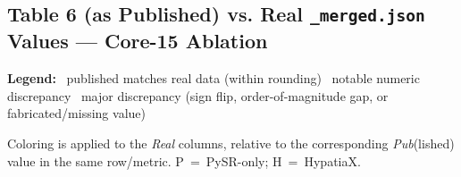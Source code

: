 \documentclass[10pt]{article}
\newcommand{\legenditem}[2]{\colorbox{#1}{\phantom{XX}}~#2}
\begin{document}
\begin{landscape}

\section*{Table 6 (as Published) vs. Real \texttt{\_merged.json} Values --- Core-15 Ablation}

\textbf{Legend:} \quad
\legenditem{match}{published matches real data (within rounding)} \qquad
\legenditem{minor}{notable numeric discrepancy} \qquad
\legenditem{major}{major discrepancy (sign flip, order-of-magnitude gap, or fabricated/missing value)}

\bigskip
\noindent Coloring is applied to the \emph{Real} columns, relative to the corresponding \emph{Pub}(lished) value in the same row/metric. P~=~PySR-only; H~=~HypatiaX.

\bigskip


\end{landscape}
\end{document}
